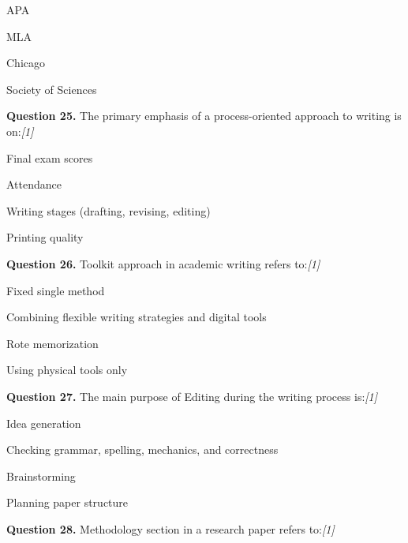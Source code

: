 \documentclass[11pt,a4paper]{article}
\newcommand{\pts}[1]{\hfill   \textit{[#1]}}
\begin{document}
\begin{parts}
  \item APA
  \item MLA
  \item Chicago
  \item Society of Sciences
\end{parts}

\medskip




\noindent   \textbf{Question 25.} The primary emphasis of a process-oriented approach to writing is on:\pts{1}

\begin{parts}
  \item Final exam scores
  \item Attendance
  \item Writing stages (drafting, revising, editing)
  \item Printing quality
\end{parts}

\medskip




\noindent   \textbf{Question 26.} Toolkit approach in academic writing refers to:\pts{1}

\begin{parts}
  \item Fixed single method
  \item Combining flexible writing strategies and digital tools
  \item Rote memorization
  \item Using physical tools only
\end{parts}

\medskip




\noindent   \textbf{Question 27.} The main purpose of Editing during the writing process is:\pts{1}

\begin{parts}
  \item Idea generation
  \item Checking grammar, spelling, mechanics, and correctness
  \item Brainstorming
  \item Planning paper structure
\end{parts}

\medskip




\noindent   \textbf{Question 28.} Methodology section in a research paper refers to:\pts{1}
\end{document}
